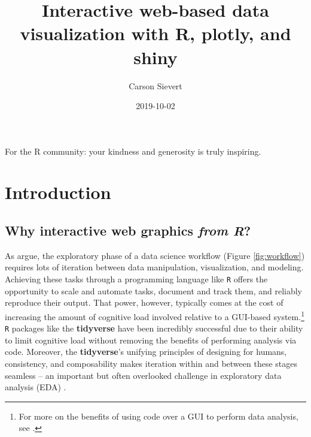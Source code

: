 \documentclass[
  12pt,
]{krantz}
\title{Interactive web-based data visualization with R, plotly, and shiny}
\author{Carson Sievert}
\date{2019-10-02}
\begin{document}
\maketitle

\thispagestyle{empty}
\begin{center}
For the R community: your kindness and generosity is truly inspiring.
\end{center}

\setlength{\abovedisplayskip}{-5pt}
\setlength{\abovedisplayshortskip}{-5pt}

{
\hypersetup{linkcolor=}
\setcounter{tocdepth}{2}
\tableofcontents
}
\mainmatter

\hypertarget{introduction}{%
\chapter{Introduction}\label{introduction}}

\hypertarget{why-interactive-web-graphics-from-r}{%
\section{\texorpdfstring{Why interactive web graphics \emph{from R}?}{Why interactive web graphics from R?}}\label{why-interactive-web-graphics-from-r}}

As \citet{r4ds} argue, the exploratory phase of a data science workflow (Figure \ref{fig:workflow}) requires lots of iteration between data manipulation, visualization, and modeling. Achieving these tasks through a programming language like \texttt{R} offers the opportunity to scale and automate tasks, document and track them, and reliably reproduce their output. That power, however, typically comes at the cost of increasing the amount of cognitive load involved relative to a GUI-based system.\footnote{For more on the benefits of using code over a GUI to perform data analysis, see \citet{data-science-gui}.} \texttt{R} packages like the \textbf{tidyverse} have been incredibly successful due to their ability to limit cognitive load without removing the benefits of performing analysis via code. Moreover, the \textbf{tidyverse}'s unifying principles of designing for humans, consistency, and composability makes iteration within and between these stages seamless -- an important but often overlooked challenge in exploratory data analysis (EDA) \citep{tidy-principles}.
\end{document}
